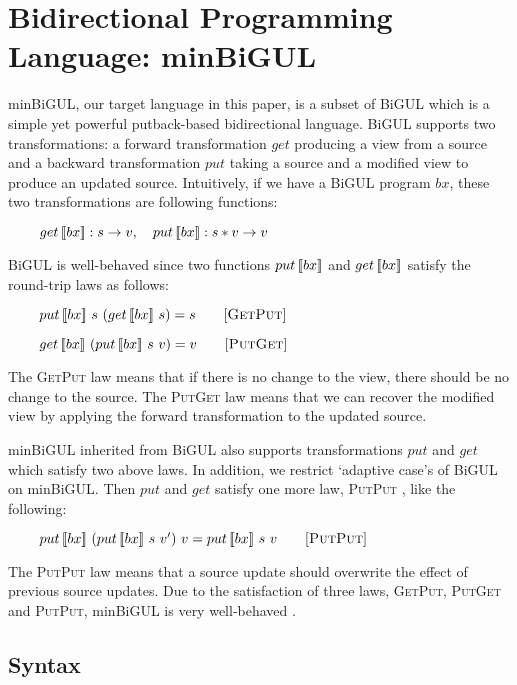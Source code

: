 \section{Bidirectional Programming Language: minBiGUL} \label{sect:minbigul}

minBiGUL, our target language in this paper, is a subset of BiGUL which is a simple yet powerful putback-based bidirectional language. BiGUL supports two transformations: a forward transformation $get$ producing a view from a source and a backward transformation $put$ taking a source and a modified view to produce an updated source. Intuitively, if we have a BiGUL program $bx$, these two transformations are following functions:

 \smallvspace
    $\hspace*{3mm} \ \quad get \, [\![bx]\!] : s \to v, \quad put \, [\![bx]\!] : s * v \to v$
 \smallvspace
 
BiGUL is well-behaved \cite{Pacheco:2014:MCP:2543728.2543737} since two functions $put \, [\![bx]\!]$ and $get \, [\![bx]\!]$ satisfy the round-trip laws as follows:

\smallvspace
    $\hspace*{3mm} \ \quad put \, [\![bx]\!] \ s \ (get \, [\![bx]\!] \ s) = s \qquad [\textsc{GetPut}]$
    
    $\hspace*{3mm} \ \quad get \, [\![bx]\!] \ (put \, [\![bx]\!] \ s \ v) = v \qquad [\textsc{PutGet}]$
\smallvspace

The \textsc{GetPut} law means that if there is no change to the view, there should be no change to the source. The \textsc{PutGet} law means that we can recover the modified view by applying the forward transformation to the updated source.

minBiGUL inherited from BiGUL also supports transformations $put$ and $get$ which satisfy two above laws. In addition, we restrict `adaptive case's of BiGUL on minBiGUL. Then $put$ and $get$ satisfy one more law, \textsc{PutPut} \cite{Foster:2007:CBT:1232420.1232424}, like the following:

\smallvspace
$\hspace*{3mm} \ \quad put \, [\![bx]\!] \ (put \, [\![bx]\!] \ s \ v') \ v = put \, [\![bx]\!] \ s \ v \qquad [\textsc{PutPut}]$
\smallvspace

The \textsc{PutPut} law means that a source update should overwrite the effect of previous source updates. Due to the satisfaction of three laws, \textsc{GetPut}, \textsc{PutGet} and \textsc{PutPut}, minBiGUL is very well-behaved \cite{Foster:2007:CBT:1232420.1232424}.

\subsection{Syntax}

